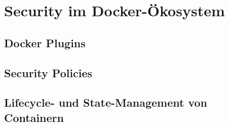 \documentclass[../main.tex]{subfiles}
\begin{document}


\chapter{Security im Docker-Ökosystem}
\label{secEcosysstem}



  \section{Docker Plugins}

  \section{Security Policies}

  \section{Lifecycle- und State-Management von Containern}
\end{document}
